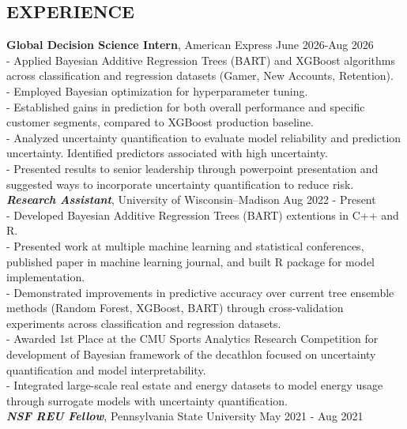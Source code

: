 \documentclass[margin]{res}
\begin{document}
\begin{resume}
\section{EXPERIENCE}
\textbf{Global Decision Science Intern}, American Express \hfill June 2026-Aug 2026 \\
- Applied Bayesian Additive Regression Trees (BART) and XGBoost algorithms across classification and regression datasets (Gamer, New Accounts, Retention). \\
- Employed Bayesian optimization for hyperparameter tuning. \\
- Established gains in prediction for both overall performance and specific customer segments, compared to XGBoost production baseline.\\
- Analyzed uncertainty quantification to evaluate model reliability and prediction uncertainty. Identified predictors associated with high uncertainty. \\
- Presented results to senior leadership through powerpoint presentation and suggested ways to incorporate uncertainty quantification to reduce risk. \\
\textbf{\emph{Research Assistant}}, University of Wisconsin--Madison \hfill Aug 2022 - Present \\
- Developed Bayesian Additive Regression Trees (BART) extentions in C++ and R. \\
- Presented work at multiple machine learning and statistical conferences, published paper in machine learning journal, and built R package for model implementation. \\
- Demonstrated improvements in predictive accuracy over current tree ensemble methods (Random Forest, XGBoost, BART) through cross-validation experiments across classification and regression datasets. \\
- Awarded 1st Place at the CMU Sports Analytics Research Competition for development of Bayesian framework of the decathlon focused on uncertainty quantification and model interpretability.  \\
- Integrated large-scale real estate and energy datasets to model energy usage through surrogate models with uncertainty quantification. \\
\textbf{\emph{NSF REU Fellow}}, Pennsylvania State University \hfill May 2021 - Aug 2021 \\

\end{resume}
\end{document}
